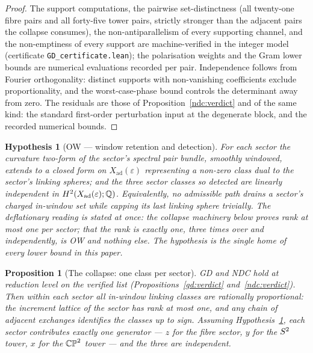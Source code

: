 \documentclass[11pt]{article}
\numberwithin{equation}{section}
\theoremstyle{plain}
\newtheorem{proposition}[theorem]{Proposition}
\newtheorem{hypothesis}[theorem]{Hypothesis}
\theoremstyle{definition}
\theoremstyle{remark}
\newcommand{\Xad}{X_{\mathrm{ad}}}
\begin{document}
\begin{proof}
The support computations, the pairwise set-distinctness (all
twenty-one fibre pairs and all forty-five tower pairs, strictly
stronger than the adjacent pairs the collapse consumes), the
non-antiparallelism of every supporting channel, and the
non-emptiness of every support are machine-verified in the integer
model (certificate \texttt{GD\_certificate.lean}); the polarisation
weights and the Gram lower bounds are numerical evaluations
recorded per pair. Independence follows from Fourier orthogonality:
distinct supports with non-vanishing coefficients exclude
proportionality, and the worst-case-phase bound controls the
determinant away from zero. The residuals are those of
Proposition~\ref{ndc:verdict} and of the same kind: the standard
first-order perturbation input at the degenerate block, and the
recorded numerical bounds.
\end{proof}

\begin{hypothesis}[OW --- window retention and
detection]\label{rb2:ow}
For each sector the curvature two-form of the sector's spectral
pair bundle, smoothly windowed, extends to a closed form on
$\Xad(\varepsilon)$ representing a non-zero class dual to the
sector's linking spheres; and the three sector classes so detected
are linearly independent in $H^{2}(\Xad(\varepsilon); \Q)$.
Equivalently, no admissible path drains a sector's charged
in-window set while capping its last linking sphere trivially. The
deflationary reading is stated at once: the collapse machinery
below proves rank at most one per sector; that the rank is exactly
one, three times over and independently, is OW and nothing else.
The hypothesis is the single home of every lower bound in this
paper.
\end{hypothesis}

\begin{proposition}[The collapse: one class per
sector]\label{rb2:collapse}
GD and NDC hold at reduction level on the verified list
\textup{(Propositions~\ref{gd:verdict} and~\ref{ndc:verdict})}.
Then within each sector all in-window linking classes are
rationally proportional: the increment lattice of the sector has
rank at most one, and any chain of adjacent exchanges identifies
the classes up to sign. Assuming
Hypothesis~\textup{\ref{rb2:ow}}, each sector contributes exactly
one generator --- $z$ for the fibre sector, $y$ for the $S^2$
tower, $x$ for the $\mathbb{CP}^2$ tower --- and the three are
independent.
\end{proposition}
\end{document}
